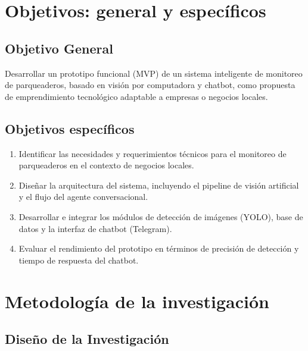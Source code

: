\section{Objetivos: general y específicos}

\subsection{Objetivo General}
Desarrollar un prototipo funcional (MVP) de un sistema inteligente de monitoreo de parqueaderos, basado en visión por computadora y chatbot, como propuesta de emprendimiento tecnológico adaptable a empresas o negocios locales.

\subsection{Objetivos específicos}
\begin{enumerate}
    \item Identificar las necesidades y requerimientos técnicos para el monitoreo de parqueaderos en el contexto de negocios locales.
    \item Diseñar la arquitectura del sistema, incluyendo el pipeline de visión artificial y el flujo del agente conversacional.
    \item Desarrollar e integrar los módulos de detección de imágenes (YOLO), base de datos y la interfaz de chatbot (Telegram).
    \item Evaluar el rendimiento del prototipo en términos de precisión de detección y tiempo de respuesta del chatbot.
\end{enumerate}

% 
\section{Metodología de la investigación}

\subsection{Diseño de la Investigación}

